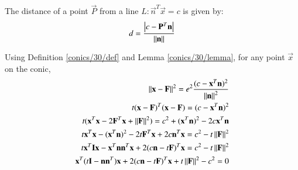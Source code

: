 \begin{lemma}
    \label{conics/30/lemma}
    The distance of a point $\vec{P}$ from a line $L: \vec{n}^T\vec{x}=c$ is given by:
    \begin{align}
    d = \frac{\left\vert c-\mathbf{P}^T\mathbf{n}\right\vert}{\left\lVert\mathbf{n}\right\rVert}   
    \end{align}
    \end{lemma}

Using Definition \ref{conics/30/def} and Lemma \ref{conics/30/lemma},  for any point $\vec{x}$ on the conic,
\begin{align}
\left\lVert\mathbf{x}-\mathbf{F}\right\rVert^2=e^2 \frac{({c-\mathbf{x}^T\mathbf{n}})^2}{\left\lVert\mathbf{n}\right\rVert^2}\label{conics/30/eq:1} \\
t(\mathbf{x}-\mathbf{F})^T(\mathbf{x}-\mathbf{F})=(c-\mathbf{x}^T\mathbf{n})^2
\\
t(\mathbf{x}^T\mathbf{x}-2\mathbf{F}^T\mathbf{x}+\left\lVert\mathbf{F}\right\rVert^2)=c^2+(\mathbf{x}^T\mathbf{n})^2-2c\mathbf{x}^T\mathbf{n}\\
t\mathbf{x}^T\mathbf{x}-(\mathbf{x}^T\mathbf{n})^2-2t\mathbf{F}^T\mathbf{x}+2c\mathbf{n}^T\mathbf{x}=c^2-t\left\lVert\mathbf{F}\right\rVert^2\\
t\mathbf{x}^T\mathbf{I}\mathbf{x}-\mathbf{x}^T\mathbf{n}\mathbf{n}^T\mathbf{x}+2(c\mathbf{n}-t\mathbf{F})^T\mathbf{x}=c^2-t\left\lVert\mathbf{F}\right\rVert^2\\
\mathbf{x}^T(t\mathbf{I}-\mathbf{n}\mathbf{n}^T)\mathbf{x}+2(c\mathbf{n}-t\mathbf{F})^T\mathbf{x}+t\left\lVert\mathbf{F}\right\rVert^2-c^2=0
\end{align}

